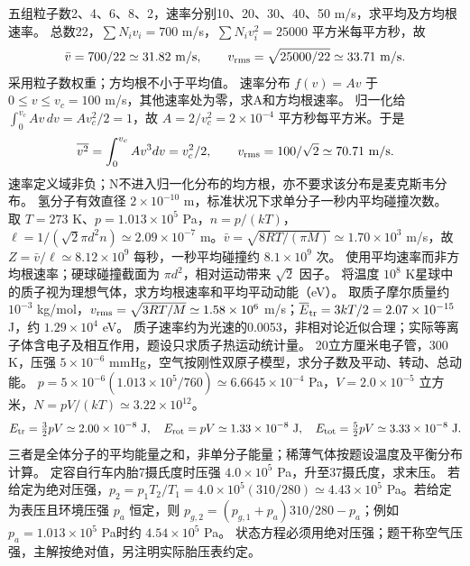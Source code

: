\problemtext 五组粒子数2、4、6、8、2，速率分别10、20、30、40、50 m/s，求平均及方均根速率。
\workings 总数22，$\sum N_iv_i=700$ m/s，$\sum N_iv_i^2=25000$ 平方米每平方秒，故
\[
\bar v=700/22\simeq31.82\ \mathrm{m/s},\qquad
v_{\rm rms}=\sqrt{25000/22}\simeq33.71\ \mathrm{m/s}.
\]
\crosscheck 采用粒子数权重；方均根不小于平均值。
\problemtext 速率分布 $f(v)=Av$ 于 $0\le v\le v_c=100$ m/s，其他速率处为零，求A和方均根速率。
\workings 归一化给 $\int_0^{v_c}Av\,dv=Av_c^2/2=1$，故 $A=2/v_c^2=2\times10^{-4}$ 平方秒每平方米。于是
\[
\overline{v^2}=\int_0^{v_c}Av^3dv=v_c^2/2,\qquad v_{\rm rms}=100/\sqrt2\simeq70.71\ \mathrm{m/s}.
\]
\crosscheck 速率定义域非负；N不进入归一化分布的均方根，亦不要求该分布是麦克斯韦分布。
\problemtext 氢分子有效直径 $2\times10^{-10}$ m，标准状况下求单分子一秒内平均碰撞次数。
\workings 取 $T=273$ K、$p=1.013\times10^5$ Pa，$n=p/(kT)$，$\ell=1/(\sqrt2\pi d^2n)\simeq2.09\times10^{-7}$ m。$\bar v=\sqrt{8RT/(\pi M)}\simeq1.70\times10^3$ m/s，故 $Z=\bar v/\ell\simeq8.12\times10^9$ 每秒，一秒平均碰撞约 $8.1\times10^9$ 次。
\crosscheck 使用平均速率而非方均根速率；硬球碰撞截面为 $\pi d^2$，相对运动带来 $\sqrt2$ 因子。
\problemtext 将温度 $10^8$ K星球中的质子视为理想气体，求方均根速率和平均平动动能（eV）。
\workings 取质子摩尔质量约 $10^{-3}$ kg/mol，$v_{\rm rms}=\sqrt{3RT/M}\simeq1.58\times10^6$ m/s；$\overline E_{\rm tr}=3kT/2=2.07\times10^{-15}$ J，约 $1.29\times10^4$ eV。
\crosscheck 质子速率约为光速的0.0053，非相对论近似合理；实际等离子体含电子及相互作用，题设只求质子热运动统计量。
\problemtext 20立方厘米电子管，300 K，压强 $5\times10^{-6}$ mmHg，空气按刚性双原子模型，求分子数及平动、转动、总动能。
\workings $p=5\times10^{-6}(1.013\times10^5/760)\simeq6.6645\times10^{-4}$ Pa，$V=2.0\times10^{-5}$ 立方米，$N=pV/(kT)\simeq3.22\times10^{12}$。
\[
E_{\rm tr}=\tfrac32pV\simeq2.00\times10^{-8}\ \mathrm J,\quad
E_{\rm rot}=pV\simeq1.33\times10^{-8}\ \mathrm J,\quad
E_{\rm tot}=\tfrac52pV\simeq3.33\times10^{-8}\ \mathrm J.
\]
\crosscheck 三者是全体分子的平均能量之和，非单分子能量；稀薄气体按题设温度及平衡分布计算。
\problemtext 定容自行车内胎7摄氏度时压强 $4.0\times10^5$ Pa，升至37摄氏度，求末压。
\workings 若给定为绝对压强，$p_2=p_1T_2/T_1=4.0\times10^5(310/280)\simeq4.43\times10^5$ Pa。若给定为表压且环境压强 $p_a$ 恒定，则 $p_{g,2}=(p_{g,1}+p_a)310/280-p_a$；例如 $p_a=1.013\times10^5$ Pa时约 $4.54\times10^5$ Pa。
\crosscheck 状态方程必须用绝对压强；题干称空气压强，主解按绝对值，另注明实际胎压表约定。
